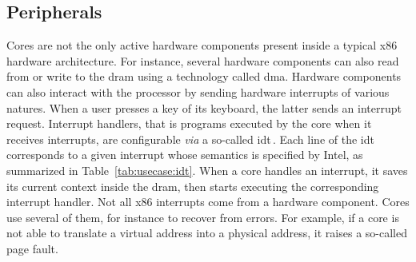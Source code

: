 \subsection{Peripherals \IOs}
\label{subsec:usecase:periphio}

Cores are not the only active hardware components present inside a typical x86
hardware architecture.
%
For instance, several hardware components can also read from or write to the
\ac{dram} using a technology called \ac{dma}.
%
Hardware components can also interact with the processor by sending hardware
interrupts of various natures.
%
When a user presses a key of its keyboard, the latter sends an interrupt
request.
%
Interrupt handlers, that is programs executed by the core when it receives
interrupts, are configurable \emph{via} a so-called \ac{idt}\,\cite[Volume 3,
Chapter 6]{intel2014manual}.
%
Each line of the \ac{idt} corresponds to a given interrupt whose semantics is
specified by Intel, as summarized in Table~\ref{tab:usecase:idt}.
%
When a core handles an interrupt, it saves its current context inside the
\ac{dram}, then starts executing the corresponding interrupt handler.
%
Not all x86 interrupts come from a hardware component.
%
Cores use several of them, for instance to recover from errors.
%
For example, if a core is not able to translate a virtual address into a
physical address, it raises a so-called page fault.

